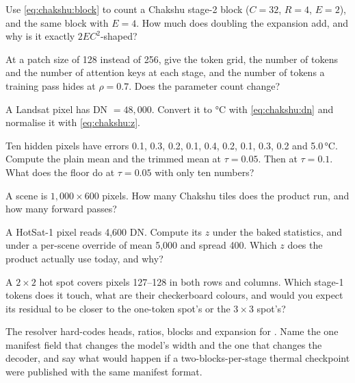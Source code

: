 \begin{checkyourself}
\item\label{ex:chakshu:1} Use \cref{eq:chakshu:block} to count a Chakshu stage-2 block ($C=32$, $R=4$, $E=2$), and the
same block with $E=4$. How much does doubling the expansion add, and why is it exactly $2EC^2$-shaped?
\item\label{ex:chakshu:2} At a patch size of 128 instead of 256, give the token grid, the number of tokens and the
number of attention keys at each stage, and the number of tokens a training pass hides at $\rho=0.7$. Does the
parameter count change?
\item\label{ex:chakshu:3} A Landsat pixel has DN $=48{,}000$. Convert it to °C with \cref{eq:chakshu:dn} and normalise
it with \cref{eq:chakshu:z}.
\item\label{ex:chakshu:4} Ten hidden pixels have errors 0.1, 0.3, 0.2, 0.1, 0.4, 0.2, 0.1, 0.3, 0.2 and 5.0\,°C. Compute
the plain mean and the trimmed mean at $\tau=0.05$. Then at $\tau=0.1$. What does the floor do at $\tau=0.05$ with
only ten numbers?
\item\label{ex:chakshu:5} A scene is $1{,}000\times600$ pixels. How many Chakshu tiles does the product run, and how
many forward passes?
\item\label{ex:chakshu:6} A HotSat-1 pixel reads 4,600 DN. Compute its $z$ under the baked statistics, and under a
per-scene override of mean 5,000 and spread 400. Which $z$ does the product actually use today, and why?
\item\label{ex:chakshu:7} A $2\times2$ hot spot covers pixels 127--128 in both rows and columns. Which stage-1 tokens does
it touch, what are their checkerboard colours, and would you expect its residual to be closer to the one-token spot's
or the $3\times3$ spot's?
\item\label{ex:chakshu:8} The resolver hard-codes heads, ratios, blocks and expansion for . Name
the one manifest field that changes the model's width and the one that changes the decoder, and say what would happen
if a two-blocks-per-stage thermal checkpoint were published with the same manifest format.
\end{checkyourself}

